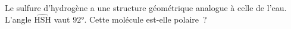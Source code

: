 Le sulfure d'hydrogène  a une structure géométrique
analogue à celle de l'eau. L'angle $\widehat{\text{HSH}}$ vaut $\ang{92}$.
Cette molécule est-elle polaire~?


